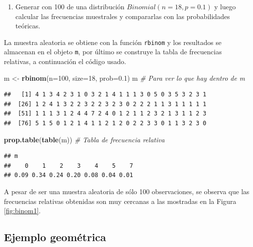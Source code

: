 \documentclass[10pt,]{krantz}
\makeatletter
\newenvironment{Shaded}{\begin{snugshade}}{\end{snugshade}}
\newcommand{\KeywordTok}[1]{\textcolor[rgb]{0.13,0.29,0.53}{\textbf{{#1}}}}
\newcommand{\DataTypeTok}[1]{\textcolor[rgb]{0.13,0.29,0.53}{{#1}}}
\newcommand{\DecValTok}[1]{\textcolor[rgb]{0.00,0.00,0.81}{{#1}}}
\newcommand{\FloatTok}[1]{\textcolor[rgb]{0.00,0.00,0.81}{{#1}}}
\newcommand{\StringTok}[1]{\textcolor[rgb]{0.31,0.60,0.02}{{#1}}}
\newcommand{\CommentTok}[1]{\textcolor[rgb]{0.56,0.35,0.01}{\textit{{#1}}}}
\newcommand{\NormalTok}[1]{{#1}}
\providecommand{\tightlist}{%
  \setlength{\itemsep}{0pt}\setlength{\parskip}{0pt}}
\newenvironment{kframe}{%
\medskip{}
\setlength{\fboxsep}{.8em}
 \def\at@end@of@kframe{}%
 \ifinner\ifhmode%
  \def\at@end@of@kframe{\end{minipage}}%
  \begin{minipage}{\columnwidth}%
 \fi\fi%
 \def\FrameCommand##1{\hskip\@totalleftmargin \hskip-\fboxsep
 \colorbox{shadecolor}{##1}\hskip-\fboxsep
     \hskip-\linewidth \hskip-\@totalleftmargin \hskip\columnwidth}%
 \MakeFramed {\advance\hsize-\width
   \@totalleftmargin\z@ \linewidth\hsize
   \@setminipage}}%
 {\par\unskip\endMakeFramed%
 \at@end@of@kframe}
\renewenvironment{Shaded}{\begin{kframe}}{\end{kframe}}
\makeatother
\begin{document}
\begin{enumerate}
\def\labelenumi{\arabic{enumi})}
\setcounter{enumi}{4}
\tightlist
\item
  Generar con 100 de una distribución \(Binomial(n=18, p=0.1)\) y luego
  calcular las frecuencias muestrales y compararlas con las
  probabilidades teóricas.
\end{enumerate}

La muestra aleatoria se obtiene con la función \texttt{rbinom} y los
resultados se almacenan en el objeto \texttt{m}, por último se construye
la tabla de frecuencias relativas, a continuación el código usado.

\begin{Shaded}
\begin{Highlighting}[]
\NormalTok{m <-}\StringTok{ }\KeywordTok{rbinom}\NormalTok{(}\DataTypeTok{n=}\DecValTok{100}\NormalTok{, }\DataTypeTok{size=}\DecValTok{18}\NormalTok{, }\DataTypeTok{prob=}\FloatTok{0.1}\NormalTok{)}
\NormalTok{m  }\CommentTok{# Para ver lo que hay dentro de m}
\end{Highlighting}
\end{Shaded}

\begin{verbatim}
##   [1] 4 1 3 4 2 3 1 0 3 2 1 4 1 1 1 3 0 5 0 3 5 3 2 3 1
##  [26] 1 2 4 1 3 2 2 3 2 2 3 2 3 0 2 2 2 1 1 3 1 1 1 1 1
##  [51] 1 1 1 3 1 2 4 4 7 2 4 0 1 2 1 1 2 3 2 1 3 1 1 2 3
##  [76] 5 1 5 0 1 2 1 4 1 1 2 1 2 0 2 2 3 3 0 1 1 3 2 3 0
\end{verbatim}

\begin{Shaded}
\begin{Highlighting}[]
\KeywordTok{prop.table}\NormalTok{(}\KeywordTok{table}\NormalTok{(m))  }\CommentTok{# Tabla de frecuencia relativa}
\end{Highlighting}
\end{Shaded}

\begin{verbatim}
## m
##    0    1    2    3    4    5    7 
## 0.09 0.34 0.24 0.20 0.08 0.04 0.01
\end{verbatim}

A pesar de ser una muestra aleatoria de sólo 100 observaciones, se
observa que las frecuencias relativas obtenidas son muy cercanas a las
mostradas en la Figura \ref{fig:binom1}.

\subsection*{Ejemplo geométrica}\label{ejemplo-geometrica}
\end{document}
